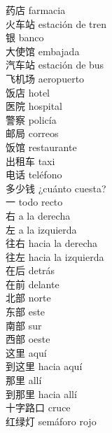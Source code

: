 药店 \quad farmacia\\
火车站 \quad estación de tren\\
银 \quad banco\\
大使馆 \quad embajada\\
汽车站 \quad estación de bus\\
飞机场 \quad aeropuerto\\
饭店 \quad hotel\\
医院 \quad hospital\\
警察 \quad policía\\
邮局 \quad correos\\
饭馆 \quad restaurante\\
出租车 \quad taxi\\
电话 \quad teléfono\\
多少钱 \quad ¿cuánto cuesta?\\
一 \quad todo recto\\
右 \quad a la derecha\\
左 \quad a la izquierda\\
往右 \quad hacia la derecha\\
往左 \quad hacia la izquierda\\
在后 \quad detrás\\
在前 \quad delante\\
北部 \quad norte\\
东部 \quad este\\
南部 \quad sur\\
西部 \quad oeste\\
这里 \quad aquí\\
到这里 \quad hacia aquí\\
那里 \quad allí\\
到那里 \quad hacia allí\\
十字路口 \quad cruce\\
红绿灯 \quad semáforo rojo\\
